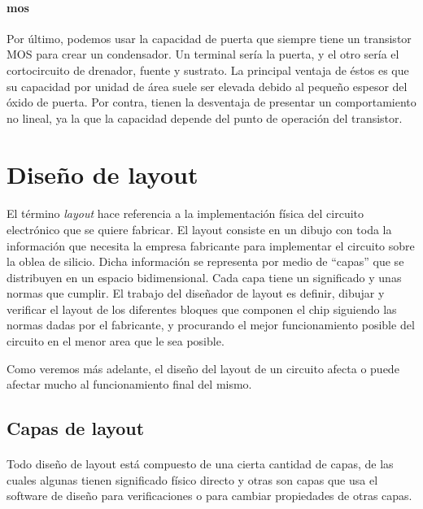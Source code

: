 \paragraph{mos}
Por último, podemos usar la capacidad de puerta que siempre tiene un transistor MOS
para crear un condensador. Un terminal sería la puerta, y el otro sería el cortocircuito
de drenador, fuente y sustrato. La principal ventaja de éstos es que su capacidad por
unidad de área suele ser elevada debido al pequeño espesor del óxido de puerta. Por contra,
tienen la desventaja de presentar un comportamiento no lineal, ya la que la capacidad
depende del punto de operación del transistor.

\section{Diseño de layout}\label{cap:layout}

\paragraph{}
El término \textit{layout} hace referencia a la implementación física del circuito
electrónico que se quiere fabricar. El layout consiste en un dibujo con toda
la información que necesita la empresa fabricante para implementar el circuito
sobre la oblea de silicio. Dicha información se representa por medio de ``capas''
que se distribuyen en un espacio bidimensional. Cada capa tiene un significado y
unas normas que cumplir. El trabajo del diseñador de layout es definir, dibujar y
verificar el layout de los diferentes bloques que componen el chip siguiendo
las normas dadas por el fabricante, y procurando el mejor funcionamiento posible
del circuito en el menor area que le sea posible.

Como veremos más adelante, el diseño del layout de un circuito afecta o puede afectar
mucho al funcionamiento final del mismo.

\subsection{Capas de layout}\label{cap:capas_layout}

\paragraph{}
Todo diseño de layout está compuesto de una cierta cantidad de capas, de las cuales
algunas tienen significado físico directo y otras son capas que usa el software de
diseño para verificaciones o para cambiar propiedades de otras capas.

